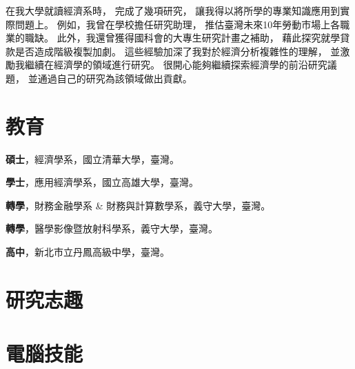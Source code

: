 \documentclass[utf8, 12pt]{article} %
\begin{document}
在我大學就讀經濟系時，
完成了幾項研究，
讓我得以將所學的專業知識應用到實際問題上。
例如，我曾在學校擔任研究助理，
推估臺灣未來10年勞動市場上各職業的職缺。
此外，我還曾獲得國科會的大專生研究計畫之補助，
藉此探究就學貸款是否造成階級複製加劇。
這些經驗加深了我對於經濟分析複雜性的理解，
並激勵我繼續在經濟學的領域進行研究。
很開心能夠繼續探索經濟學的前沿研究議題，
並通過自己的研究為該領域做出貢獻。


\section{教育}

{{\bf 碩士}，經濟學系，國立清華大學，臺灣。}

{{\bf 學士}，應用經濟學系，國立高雄大學，臺灣。}

{{\bf 轉學}，財務金融學系 \& 財務與計算數學系，義守大學，臺灣。}

{{\bf 轉學}，醫學影像暨放射科學系，義守大學，臺灣。}

{{\bf 高中}，新北市立丹鳳高級中學，臺灣。}


\section{研究志趣}


\section{電腦技能}
\end{document}
